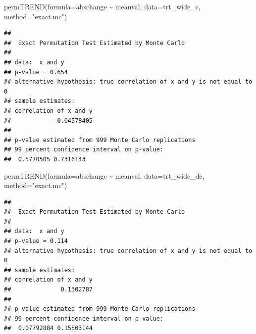 \documentclass[
]{article}
\newenvironment{Shaded}{\begin{snugshade}}{\end{snugshade}}
\newcommand{\AttributeTok}[1]{\textcolor[rgb]{0.77,0.63,0.00}{#1}}
\newcommand{\FunctionTok}[1]{\textcolor[rgb]{0.00,0.00,0.00}{#1}}
\newcommand{\NormalTok}[1]{#1}
\newcommand{\SpecialCharTok}[1]{\textcolor[rgb]{0.00,0.00,0.00}{#1}}
\newcommand{\StringTok}[1]{\textcolor[rgb]{0.31,0.60,0.02}{#1}}
\begin{document}
\begin{Shaded}
\begin{Highlighting}[]
\FunctionTok{permTREND}\NormalTok{(}\AttributeTok{formula=}\NormalTok{abschange }\SpecialCharTok{\textasciitilde{}}\NormalTok{ meanval, }\AttributeTok{data=}\NormalTok{trt\_wide\_c,}
          \AttributeTok{method=}\StringTok{"exact.mc"}\NormalTok{)}
\end{Highlighting}
\end{Shaded}

\begin{verbatim}
## 
##  Exact Permutation Test Estimated by Monte Carlo
## 
## data:  x and y
## p-value = 0.654
## alternative hypothesis: true correlation of x and y is not equal to 0
## sample estimates:
## correlation of x and y 
##            -0.04578405 
## 
## p-value estimated from 999 Monte Carlo replications
## 99 percent confidence interval on p-value:
##  0.5770505 0.7316143
\end{verbatim}

\begin{Shaded}
\begin{Highlighting}[]
\FunctionTok{permTREND}\NormalTok{(}\AttributeTok{formula=}\NormalTok{abschange }\SpecialCharTok{\textasciitilde{}}\NormalTok{ meanval, }\AttributeTok{data=}\NormalTok{trt\_wide\_dc,}
          \AttributeTok{method=}\StringTok{"exact.mc"}\NormalTok{)}
\end{Highlighting}
\end{Shaded}

\begin{verbatim}
## 
##  Exact Permutation Test Estimated by Monte Carlo
## 
## data:  x and y
## p-value = 0.114
## alternative hypothesis: true correlation of x and y is not equal to 0
## sample estimates:
## correlation of x and y 
##              0.1302787 
## 
## p-value estimated from 999 Monte Carlo replications
## 99 percent confidence interval on p-value:
##  0.07792884 0.15503144
\end{verbatim}
\end{document}
